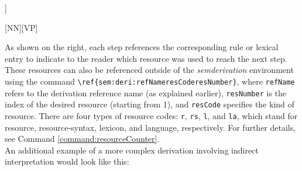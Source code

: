 \documentclass[10pt, a4paper]{article}
\begin{document}
	\begin{semcalc}[\stwo]
		\begin{semtreesem}
			\begin{forest}
				[{\e{Peter sleeps}\\S:\typet},name=0
				[{\e{Peter}\\NN:\typee},name=00]
				[{\e{sleeps}\\V:\typeet},name=01]
				]
			\end{forest}
		\end{semtreesem}
		\begin{semlang}
		\end{semlang}
		\begin{semrule}
			\rsrdesbjpred
		\end{semrule}
		\begin{semlex}
		\end{semlex}
		\begin{semderi}
		\end{semderi}
	\end{semcalc}
	As shown on the right, each step references the corresponding rule or lexical entry to indicate to the reader which resource was used to reach the next step. These resources can also be referenced outside of the \textit{semderivation} environment using the command \verb=\ref{sem:deri:refNameresCoderesNumber}=, where \texttt{refName} refers to the derivation reference name (as explained earlier), \texttt{resNumber} is the index of the desired resource (starting from 1), and \texttt{resCode} specifies the kind of resource. There are four types of resource codes: \texttt{r}, \texttt{rs}, \texttt{l}, and \texttt{la}, which stand for resource, resource-syntax, lexicon, and language, respectively. For further details, see Command \ref{command:resourceCounter}.
	\\
	An additional example of a more complex derivation involving indirect interpretation would look like this:
\end{document}
